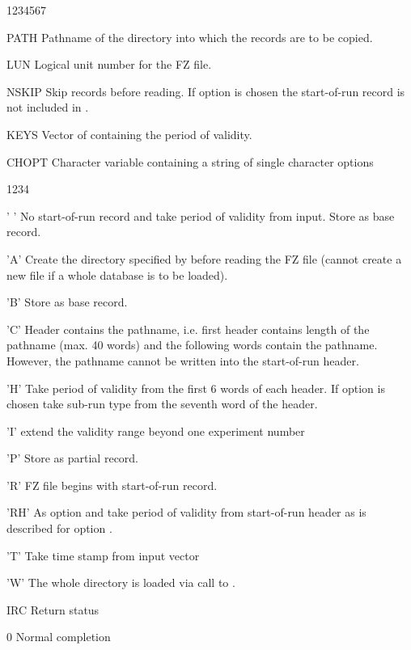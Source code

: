 \begin{DLtt}{1234567}
\item[PATH]Pathname of the directory into which the records are
  to be copied.
\item[LUN]Logical unit number for the FZ file.
\item[NSKIP]Skip  records before reading.
  If option  is chosen the
  start-of-run record is not included in .
\item[KEYS]Vector of  containing the period of validity.
\item[CHOPT]Character variable containing a string of single character options
  \begin{DLtt}{1234}
    \item[' ']No start-of-run record and take period
      of validity from input. Store as base record.
    \item['A']Create the directory specified by  before
      reading the FZ file (cannot create a new file
      if a whole database is to be loaded).
    \item['B']Store as base record.
    \item['C']Header contains the pathname, i.e. first header
      contains length of the pathname (max. 40 words)
      and the following words contain the pathname.
      However, the pathname cannot be written into the start-of-run header.
    \item['H']Take period of validity from the first 6 words of each header.
      If option  is chosen take
      sub-run type from the seventh word of the header.
    \item['I']extend the validity range beyond one experiment number
    \item['P']Store as partial record.
    \item['R']FZ file begins with start-of-run record.
    \item['RH']As option  and take period of validity from
      start-of-run header as is described for option .
    \item['T']Take time stamp from input  vector
    \item['W']The whole directory is loaded via call to .
  \end{DLtt}
\item[IRC]Return status
  \begin{DLtt}{12}
    \item[0]Normal completion
  \end{DLtt}
\end{DLtt}

